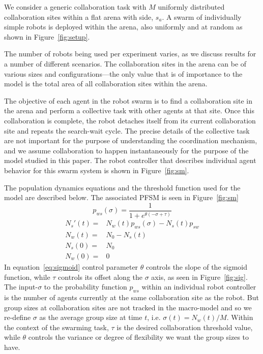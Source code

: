 \documentclass[Main.tex]{subfiles}
\begin{document}
We consider a generic collaboration task with $M$ uniformly distributed collaboration sites within a flat arena with side, $s_a$. A swarm of individually simple robots is deployed within the arena, also uniformly and at random as shown in Figure~\ref{fig:setup}. 

The number of robots being used per experiment varies, as we discuss results for a number of different scenarios. The collaboration sites in the arena can be of various sizes and configurations---the only value that is of importance to the model is the total area of all collaboration sites within the arena.

The objective of each agent in the robot swarm is to find a collaboration site in the arena and perform a collective task with other agents at that site. Once this collaboration is complete, the robot detaches itself from its current collaboration site and repeats the search-wait cycle. The precise details of the collective task are not important for the purpose of understanding the coordination mechanism, and we assume collaboration to happen instantaneously for the purpose of the model studied in this paper. The robot controller that describes individual agent behavior for this swarm system is shown in Figure~\ref{fig:sm}.

The population dynamics equations and the threshold function used for the model are described below. The associated PFSM is seen in Figure~\ref{fig:sm}
\begin{equation}
	p_{ws}(\sigma) = \frac{1}{1 + e^{\theta(-\sigma + \tau)}}\label{eq:sigmoid}
\end{equation}
\begin{align}
	N_s'(t) = & N_w(t)p_{ws}(\sigma) - N_s(t)p_{sw}\label{eq:macro1}\\
	N_w(t) = & N_0 - N_s(t)\\
	N_s(0) = & N_0\\
	N_w(0) = & 0\label{eq:macro4}
\end{align}
In equation~\eqref{eq:sigmoid} control parameter $\theta$ controls the slope of the sigmoid function, while $\tau$ controls its offset along the $\sigma$ axis, as seen in Figure~\ref{fig:sig}. The input-$\sigma$ to the probability function $p_{ws}$ within an individual robot controller is the number of agents currently at the same collaboration site as the robot. But group sizes at collaboration sites are not tracked in the macro-model and so we re-define $\sigma$ as the average group size at time $t$, i.e. $\sigma(t) = N_w(t)/M$. Within the context of the swarming task, $\tau$ is the desired collaboration threshold value, while $\theta$ controls the variance or degree of flexibility we want the group sizes to have.
\end{document}
